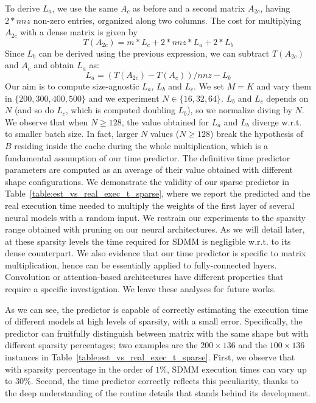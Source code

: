 To derive $L_a$, we use the same $A_c$ as before and a second matrix $A_{2c}$, having $2*nnz$ non-zero entries, organized along two columns. The cost for multiplying $A_{2c}$ with a dense matrix is given by 
$$T (A_{2c}) = m * L_c + 2*nnz *L_a + 2* L_b$$
Since $L_b$ can be derived using the previous expression, we can subtract $T(A_{2c})$ and $A_c$ and obtain $L_a$ as:
$$L_a = (T(A_{2c} )- T(A_c))/nnz -L_b$$
Our aim is to compute size-agnostic $L_a$, $L_b$ and  $L_c$. We set $M=K$ and vary them in $\{200, 300, 400, 500 \}$ and we experiment $N \in \{16, 32, 64\}$. $L_b$ and $L_c$ depends on $N$ (and so do $L_c$, which is computed doubling $L_b$), so we normalize diving by $N$. We observe that when $N \geq 128$, the value obtained for $L_a$ and $L_b$ diverge w.r.t. to smaller batch size. In fact,  larger $N$ values ($N \geq 128$) break the hypothesis of $B$ residing inside the cache during the whole multiplication, which is a fundamental assumption of our time predictor.  The definitive time predictor parameters are computed as an average of their value obtained with different shape configurations.
We demonstrate the validity of our sparse predictor in Table~\ref{table:est_vs_real_exec_t_sparse}, where we report the predicted and the real execution time needed to multiply the weights of the first layer of several neural models with a random input. We restrain our experiments to the sparsity range obtained with pruning on our neural architectures. As we will detail later, at these sparsity levels the time required for SDMM  is negligible w.r.t. to its dense counterpart. We also evidence that our time predictor is specific to matrix multiplication, hence can be essentially applied to fully-connected layers. Convolution or attention-based architectures have different properties that require a specific investigation. We leave these analyses for future works.

As we can see, the predictor is capable of correctly estimating the execution time of different models at high levels of sparsity, with a small error. Specifically, the predictor can fruitfully distinguish between matrix with the same shape but with different sparsity percentages; two examples are the $200 \times 136$ and the $100 \times 136$ instances in Table~\ref{table:est_vs_real_exec_t_sparse}. First, we observe that with sparsity percentage in the order of $1\%$, SDMM execution times can vary up to $30\%$. Second, the time predictor correctly reflects this peculiarity, thanks to the deep understanding of the routine details that stands behind its development.

